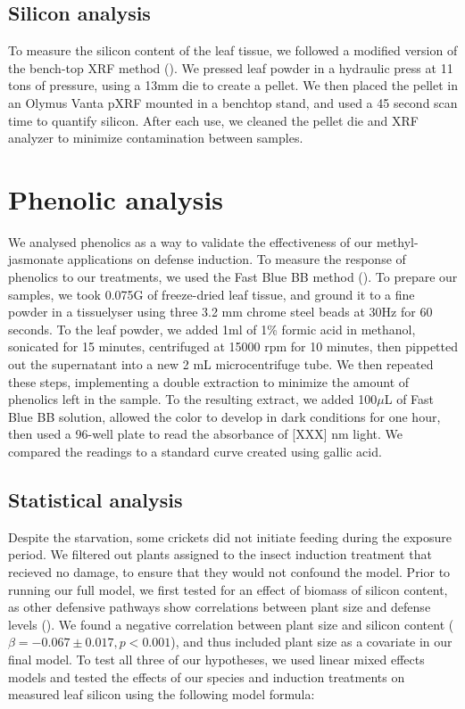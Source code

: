 \documentclass[12pt, letterpaper, ]{report}
\begin{document}
\subsection{Silicon analysis}

To measure the silicon content of the leaf tissue, we followed a modified version of the bench-top XRF method (\cite{reidinger_rapid_2012}). We pressed leaf powder in a hydraulic press at 11 tons of pressure, using a 13mm die to create a pellet. We then placed the pellet in an Olymus Vanta pXRF mounted in a benchtop stand, and used a 45 second scan time to quantify silicon. After each use, we cleaned the pellet die and XRF analyzer to minimize contamination between samples.

\section{Phenolic analysis}

We analysed phenolics as a way to validate the effectiveness of our methyl-jasmonate applications on defense induction. To measure the response of phenolics to our treatments, we used the Fast Blue BB method (\cite{pico2020systematic}). To prepare our samples, we took 0.075G of freeze-dried leaf tissue, and ground it to a fine powder in a tissuelyser using three 3.2 mm chrome steel beads at 30Hz for 60 seconds. To the leaf powder, we added 1ml of 1\% formic acid in methanol, sonicated for 15 minutes, centrifuged at 15000 rpm for 10 minutes, then pippetted out the supernatant into a new 2 mL  microcentrifuge tube. We then repeated these steps, implementing a double extraction to minimize the amount of phenolics left in the sample. To the resulting extract, we added 100$\mu$L of Fast Blue BB solution, allowed the color to develop in dark conditions for one hour, then used a 96-well plate to read the absorbance of [XXX] nm light. We compared the readings to a standard curve created using gallic acid. 

\subsection{Statistical analysis}

Despite the starvation, some crickets did not initiate feeding during the exposure period. We filtered out plants assigned to the insect induction treatment that recieved no damage, to ensure that they would not confound the model. Prior to running our full model, we first tested for an effect of biomass of silicon content, as other defensive pathways show correlations between plant size and defense levels (\cite{carmona_plant_2011}). We found a negative correlation between plant size and silicon content ($\beta = -0.067 \pm 0.017, p < 0.001$), and thus included plant size as a covariate in our final model. To test all three of our hypotheses, we used linear mixed effects models and tested the effects of our species and induction treatments on measured leaf silicon using the following model formula:
\end{document}
